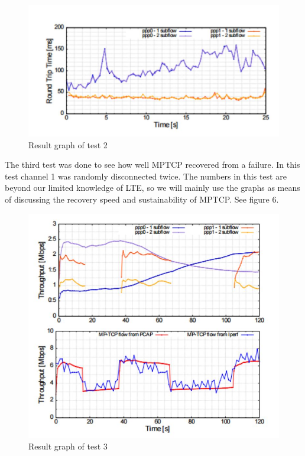 \documentclass[11pt,twocolumn]{article}
\begin{document}
\begin{figure}[ht]
\begin{center}
\includegraphics[scale=0.5]{graph_3}
\caption{Result graph of test 2}
\end{center}
\end{figure}

The third test was done to see how well MPTCP recovered from a failure. In this test channel 1 was randomly disconnected twice. The numbers in this test are beyond our limited knowledge of LTE, so we will mainly use the graphs as means of discussing the recovery speed and sustainability of MPTCP. See figure 6.

\begin{figure}[ht]
\begin{center}
\includegraphics[scale=0.6]{graph_4}
\caption{Result graph of test 3}
\end{center}
\end{figure}
\end{document}
